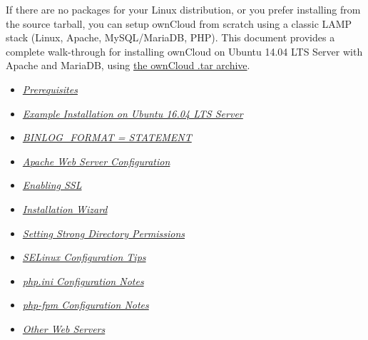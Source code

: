 \documentclass[letterpaper,10pt,english]{sphinxmanual}
\begin{document}
If there are no packages for your Linux distribution, or you prefer installing
from the source tarball, you can setup ownCloud from scratch using a classic
LAMP stack (Linux, Apache, MySQL/MariaDB, PHP). This document provides a
complete walk-through for installing ownCloud on Ubuntu 14.04 LTS Server with
Apache and MariaDB, using \href{https://owncloud.org/install/}{the ownCloud .tar archive}.
\begin{itemize}
\item {} 
{\hyperref[installation/source_installation:prerequisites\string-label]{\emph{Prerequisites}}}

\item {} 
{\hyperref[installation/source_installation:ubuntu\string-installation\string-label]{\emph{Example Installation on Ubuntu 16.04 LTS Server}}}

\item {} 
{\hyperref[installation/source_installation:binlog\string-format\string-label]{\emph{BINLOG\_FORMAT = STATEMENT}}}

\item {} 
{\hyperref[installation/source_installation:apache\string-configuration\string-label]{\emph{Apache Web Server Configuration}}}

\item {} 
{\hyperref[installation/source_installation:enabling\string-ssl\string-label]{\emph{Enabling SSL}}}

\item {} 
{\hyperref[installation/source_installation:installation\string-wizard\string-label]{\emph{Installation Wizard}}}

\item {} 
{\hyperref[installation/installation_wizard:strong\string-perms\string-label]{\emph{Setting Strong Directory Permissions}}}

\item {} 
{\hyperref[installation/source_installation:selinux\string-tips\string-label]{\emph{SELinux Configuration Tips}}}

\item {} 
{\hyperref[installation/source_installation:php\string-ini\string-tips\string-label]{\emph{php.ini Configuration Notes}}}

\item {} 
{\hyperref[installation/source_installation:php\string-fpm\string-tips\string-label]{\emph{php-fpm Configuration Notes}}}

\item {} 
{\hyperref[installation/source_installation:other\string-http\string-servers\string-label]{\emph{Other Web Servers}}}

\end{itemize}
\end{document}
